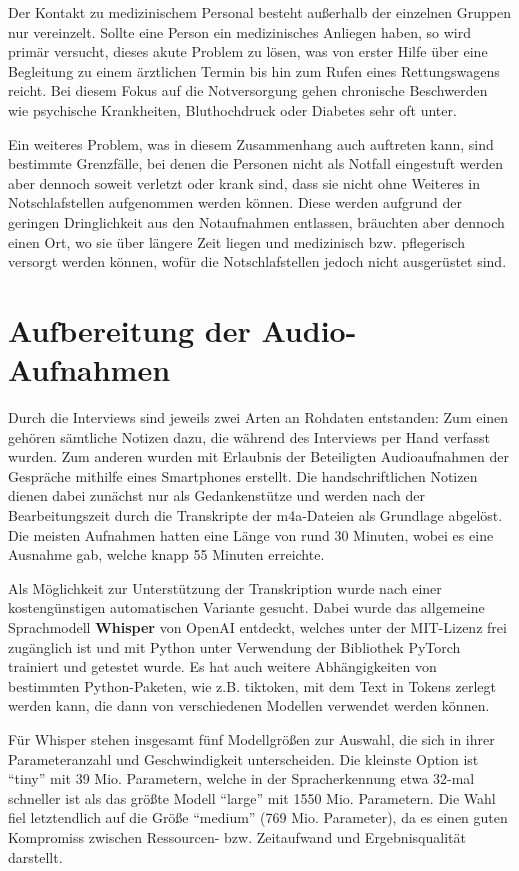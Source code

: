 Der Kontakt zu medizinischem Personal besteht außerhalb der einzelnen Gruppen nur vereinzelt. Sollte eine Person ein medizinisches Anliegen haben, so wird primär versucht, dieses akute Problem zu lösen, was von erster Hilfe über eine Begleitung zu einem ärztlichen Termin bis hin zum Rufen eines Rettungswagens reicht. Bei diesem Fokus auf die Notversorgung gehen chronische Beschwerden wie psychische Krankheiten, Bluthochdruck oder Diabetes sehr oft unter.

Ein weiteres Problem, was in diesem Zusammenhang auch auftreten kann, sind bestimmte Grenzfälle, bei denen die Personen nicht als Notfall eingestuft werden aber dennoch soweit verletzt oder krank sind, dass sie nicht ohne Weiteres in Notschlafstellen aufgenommen werden können. Diese werden aufgrund der geringen Dringlichkeit aus den Notaufnahmen entlassen, bräuchten aber dennoch einen Ort, wo sie über längere Zeit liegen und medizinisch bzw. pflegerisch versorgt werden können, wofür die Notschlafstellen jedoch nicht ausgerüstet sind. 


\section{Aufbereitung der Audio-Aufnahmen}\label{sec:audio}

Durch die Interviews sind jeweils zwei Arten an Rohdaten entstanden: Zum einen gehören sämtliche Notizen dazu, die während des Interviews per Hand verfasst wurden. Zum anderen wurden mit Erlaubnis der Beteiligten Audioaufnahmen der Gespräche mithilfe eines Smartphones erstellt. Die handschriftlichen Notizen dienen dabei zunächst nur als Gedankenstütze und werden nach der Bearbeitungszeit durch die Transkripte der m4a-Dateien als Grundlage abgelöst. Die meisten Aufnahmen hatten eine Länge von rund 30 Minuten, wobei es eine Ausnahme gab, welche knapp 55 Minuten erreichte.

Als Möglichkeit zur Unterstützung der Transkription wurde nach einer kostengünstigen automatischen Variante gesucht. Dabei wurde das allgemeine Sprachmodell \textbf{Whisper} von OpenAI entdeckt, welches unter der MIT-Lizenz frei zugänglich ist und mit Python unter Verwendung der Bibliothek PyTorch trainiert und getestet wurde. Es hat auch weitere Abhängigkeiten von bestimmten Python-Paketen, wie z.B. tiktoken, mit dem Text in Tokens zerlegt werden kann, die dann von verschiedenen Modellen verwendet werden können.

Für Whisper stehen insgesamt fünf Modellgrößen zur Auswahl, die sich in ihrer Parameteranzahl und Geschwindigkeit unterscheiden. Die kleinste Option ist \enquote{tiny} mit 39 Mio. Parametern, welche in der Spracherkennung etwa 32-mal schneller ist als das größte Modell \enquote{large} mit 1550 Mio. Parametern. Die Wahl fiel letztendlich auf die Größe \enquote{medium} (769 Mio. Parameter), da es einen guten Kompromiss zwischen Ressourcen- bzw. Zeitaufwand und Ergebnisqualität darstellt.

